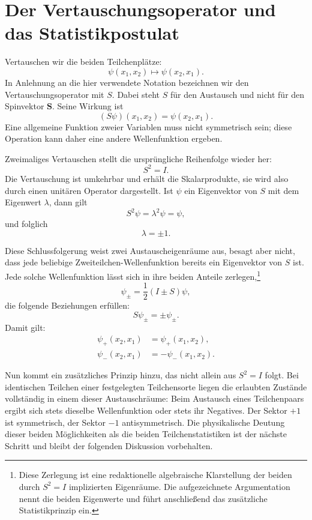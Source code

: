 \section{Der Vertauschungsoperator und das Statistikpostulat}

Vertauschen wir die beiden Teilchenplätze:
\begin{equation}
\psi(x_{1},x_{2})\longmapsto\psi(x_{2},x_{1}).
\end{equation}
In Anlehnung an die hier verwendete Notation bezeichnen wir den Vertauschungsoperator mit \(S\). Dabei steht \(S\) für den Austausch und nicht für den Spinvektor \(\mathbf S\). Seine Wirkung ist
\begin{equation}
(S\psi)(x_{1},x_{2})=\psi(x_{2},x_{1}).
\end{equation}
Eine allgemeine Funktion zweier Variablen muss nicht symmetrisch sein; diese Operation kann daher eine andere Wellenfunktion ergeben.

Zweimaliges Vertauschen stellt die ursprüngliche Reihenfolge wieder her:
\begin{equation}
S^{2}=I.
\end{equation}
Die Vertauschung ist umkehrbar und erhält die Skalarprodukte, sie wird also durch einen unitären Operator dargestellt. Ist \(\psi\) ein Eigenvektor von \(S\) mit dem Eigenwert \(\lambda\), dann gilt
\[
S^{2}\psi=\lambda^{2}\psi=\psi,
\]
und folglich
\begin{equation}
\lambda=\pm1.
\end{equation}

Diese Schlussfolgerung weist zwei Austauscheigenräume aus, besagt aber nicht, dass jede beliebige Zweiteilchen-Wellenfunktion bereits ein Eigenvektor von \(S\) ist. Jede solche Wellenfunktion lässt sich in ihre beiden Anteile zerlegen,\footnote{Diese Zerlegung ist eine redaktionelle algebraische Klarstellung der beiden durch \(S^{2}=I\) implizierten Eigenräume. Die aufgezeichnete Argumentation nennt die beiden Eigenwerte und führt anschließend das zusätzliche Statistikprinzip ein.}\begin{equation}
\psi_{\pm}=\frac12(I\pm S)\psi,
\end{equation}die folgende Beziehungen erfüllen:
\begin{equation}
S\psi_{\pm}=\pm\psi_{\pm}.
\end{equation}
Damit gilt:
\begin{align}
\psi_{+}(x_{2},x_{1})&=\psi_{+}(x_{1},x_{2}),\\
\psi_{-}(x_{2},x_{1})&=-\psi_{-}(x_{1},x_{2}).
\end{align}

Nun kommt ein zusätzliches Prinzip hinzu, das nicht allein aus \(S^{2}=I\) folgt. Bei identischen Teilchen einer festgelegten Teilchensorte liegen die erlaubten Zustände vollständig in einem dieser Austauschräume: Beim Austausch eines Teilchenpaars ergibt sich stets dieselbe Wellenfunktion oder stets ihr Negatives. Der Sektor \(+1\) ist symmetrisch, der Sektor \(-1\) antisymmetrisch. Die physikalische Deutung dieser beiden Möglichkeiten als die beiden Teilchenstatistiken ist der nächste Schritt und bleibt der folgenden Diskussion vorbehalten.
